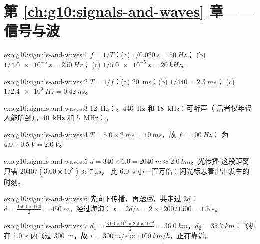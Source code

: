 \section*{第 \ref{ch:g10:signals-and-waves} 章——信号与波}

\begin{solution}{exo:g10:signals-and-waves:1}
$f = 1/T$：(a) $1/\qty{0.020}{s} = \qty{50}{Hz}$；
(b) $1/\qty{4.0e-3}{s} = \qty{250}{Hz}$；
(c) $1/\qty{5.0e-5}{s} = \qty{20}{kHz}$。
\end{solution}

\begin{solution}{exo:g10:signals-and-waves:2}
$T = 1/f$：(a) \qty{20}{ms}；(b) $1/440 = \qty{2.3}{ms}$；
(c) $1/\qty{2.4e9}{Hz} = \qty{0.42}{ns}$。
\end{solution}

\begin{solution}{exo:g10:signals-and-waves:3}
\qty{12}{Hz}：。\qty{440}{Hz} 和 \qty{18}{kHz}：可听声（
后者仅年轻人能听到）。\qty{40}{kHz} 和 \qty{5}{MHz}：。
\end{solution}

\begin{solution}{exo:g10:signals-and-waves:4}
$T = 5.0 \times \qty{2}{ms} = \qty{10}{ms}$，故 $f = \qty{100}{Hz}$；
为 $4.0 \times \qty{0.5}{V} = \qty{2.0}{V}$。
\end{solution}

\begin{solution}{exo:g10:signals-and-waves:5}
$d = 340 \times 6.0 = \qty{2040}{m} \approx \qty{2.0}{km}$。光传播
这段距离只需 $2040/(3.00\times10^{8}) \approx \qty{7}{\micro s}$，
比 \qty{6.0}{s} 小一百万倍：闪光标志着雷击发生的时刻。
\end{solution}

\begin{solution}{exo:g10:signals-and-waves:6}
先向下传播，再\emph{返回}，共走过 $2d$：
$d = \frac{1500 \times 0.60}{2} = \qty{450}{m}$。经过海沟：
$t = 2d/v = 2 \times 1200/1500 = \qty{1.6}{s}$。
\end{solution}

\begin{solution}{exo:g10:signals-and-waves:7}
$d_1 = \frac{3.00\times10^{8} \times 2.4\times10^{-4}}{2} =
\qty{36.0}{km}$，$d_2 = \qty{35.7}{km}$：飞机在
\qty{1.0}{s} 内飞过 \qty{300}{m}，故 $v = \qty{300}{m/s} \approx
\qty{1100}{km/h}$，正在靠近。
\end{solution}

